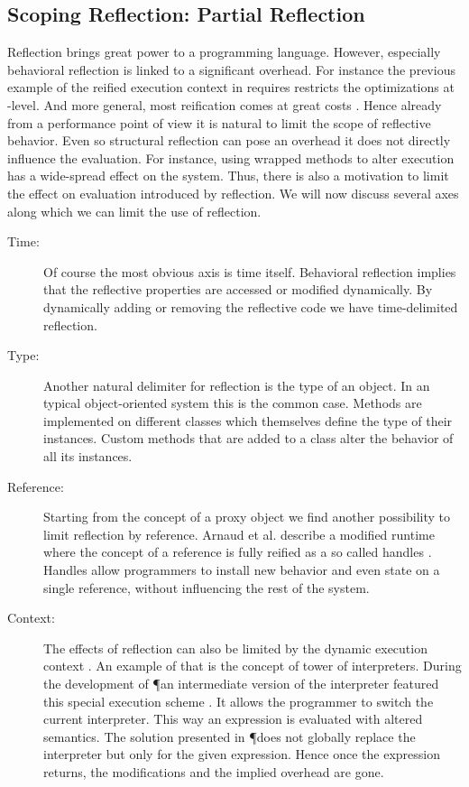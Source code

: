 \subsection{Scoping Reflection: Partial Reflection}
Reflection brings great power to a programming language.
However, especially behavioral reflection is linked to a significant overhead.
For instance the previous example of the reified execution context in \ST requires restricts the optimizations at \VM-level.
And more general, most reification comes at great costs \cite{Male96a}.
Hence already from a performance point of view it is natural to limit the scope of reflective behavior.
Even so structural reflection can pose an overhead it does not directly influence the evaluation.
For instance, using wrapped methods to alter execution has a wide-spread effect on the system.
Thus, there is also a motivation to limit the effect on evaluation introduced by reflection.
We will now discuss several axes along which we can limit the use of reflection.
%
\begin{description}
\item[Time:] Of course the most obvious axis is time itself.
	Behavioral reflection implies that the reflective properties are accessed or modified dynamically.
	By dynamically adding or removing the reflective code we have time-delimited reflection.
	
\item[Type:] Another natural delimiter for reflection is the type of an object.
	In an typical object-oriented system this is the common case.
	Methods are implemented on different classes which themselves define the type of their instances. 
	Custom methods that are added to a class alter the behavior of all its instances.

\item[Reference:] Starting from the concept of a proxy object  we find another possibility to limit reflection by reference.
	Arnaud et al. describe a modified \PH runtime where the concept of a reference is fully reified as a so called handles \cite{Arna13a}.
	Handles allow programmers to install new behavior and even state on a single reference, without influencing the rest of the system.
	
	
\item[Context:] The effects of reflection can also be limited by the dynamic execution context \cite{Tant08a}.
	An example of that is the concept of tower of interpreters.
	During the development of \P an intermediate version of the \ST interpreter featured this special execution scheme \cite{Verw10a}.
	It allows the programmer to switch the current interpreter.
	This way an expression is evaluated with altered semantics.
	The solution presented in \P does not globally replace the interpreter but only for the given expression. 
	Hence once the expression returns, the modifications and the implied overhead are gone.	
\end{description}
%


